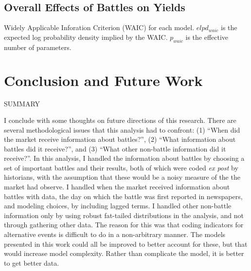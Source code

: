 \subsection{Overall Effects of Battles on Yields}
\label{sec:over-effects-battl}



\begin{table}[!htpb]
  \centering
  
  \caption{Widely Applicable Inforation Criterion (WAIC) for each model.
    $elpd_{waic}$ is the expected log probability density implied by the WAIC.
    $p_{waic}$ is the effective number of parameters.
  }
  \label{bonds:tab:waic}
\end{table}


\section{Conclusion and Future Work}
\label{sec:conclusion}

SUMMARY

I conclude with some thoughts on future directions of this research.
There are several methodological issues that this analysis had to confront: (1) ``When did the market receive information about battles?'', (2) ``What information about battles did it receive?'', and (3) ``What other non-battle information did it receive?''.
In this analysis, I handled the information about battles by choosing a set of important battles and their results, both of which were coded \textit{ex post} by historians,  with the assumption that these would be a noisy measure of the the market had observe.
I handled when the market received information about battles with data, the day on which the battle was first reported in newspapers, and modeling choices, by including lagged terms.
I handled other non-battle information only by using robust fat-tailed distributions in the analysis, and not through gathering other data.
The reason for this was that coding indicators for alternative events is difficult to do in a non-arbitrary manner.
The models presented in this work could all be improved to better account for these, but that would increase model complexity.
Rather than complicate the model, it is better to get better data.

